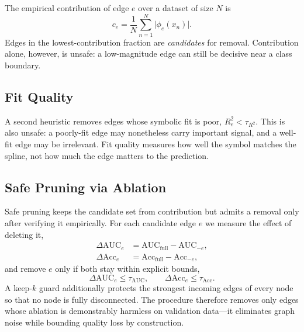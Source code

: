 \documentclass[conference]{IEEEtran}
\begin{document}
The empirical contribution of edge $e$ over a dataset of size $N$ is
\begin{equation}
c_e = \frac{1}{N}\sum_{n=1}^{N} \big|\phi_e(x_n)\big|.
\label{eq:contrib}
\end{equation}
Edges in the lowest-contribution fraction are \emph{candidates} for removal.
Contribution alone, however, is unsafe: a low-magnitude edge can still be
decisive near a class boundary.

\subsection{Fit Quality}

A second heuristic removes edges whose symbolic fit is poor, $R_e^2 < \tau_{R^2}$.
This is also unsafe: a poorly-fit edge may nonetheless carry important signal,
and a well-fit edge may be irrelevant. Fit quality measures how well the
symbol matches the spline, not how much the edge matters to the prediction.

\subsection{Safe Pruning via Ablation}

Safe pruning keeps the candidate set from contribution but admits a removal
only after verifying it empirically. For each candidate edge $e$ we measure the
effect of deleting it,
\begin{align}
\Delta \mathrm{AUC}_e &= \mathrm{AUC}_{\mathrm{full}} - \mathrm{AUC}_{-e},\\
\Delta \mathrm{Acc}_e &= \mathrm{Acc}_{\mathrm{full}} - \mathrm{Acc}_{-e},
\end{align}
and remove $e$ only if both stay within explicit bounds,
\begin{equation}
\Delta \mathrm{AUC}_e \le \tau_{\mathrm{AUC}}, \qquad
\Delta \mathrm{Acc}_e \le \tau_{\mathrm{Acc}}.
\end{equation}
A keep-$k$ guard additionally protects the strongest incoming edges of every
node so that no node is fully disconnected. The procedure therefore removes
only edges whose ablation is demonstrably harmless on validation data---it
eliminates graph noise while bounding quality loss by construction.
\end{document}
